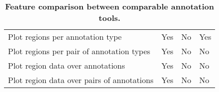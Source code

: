 \begin{table}[!ht]
\begin{tabular}{l|lll}
Plot regions per annotation type           & Yes               & No                & Yes                   \\
Plot regions per pair of annotation types  & Yes               & No                & No                    \\
Plot region data over annotations          & Yes               & No                & No                    \\
Plot region data over pairs of annotations & Yes               & No                & No
\end{tabular}
\normalsize
\caption[Feature comparison between comparable annotation tools.]
{
\textbf{Feature comparison between comparable annotation tools.}
}
\label{chap4:table:7}

\end{table}
